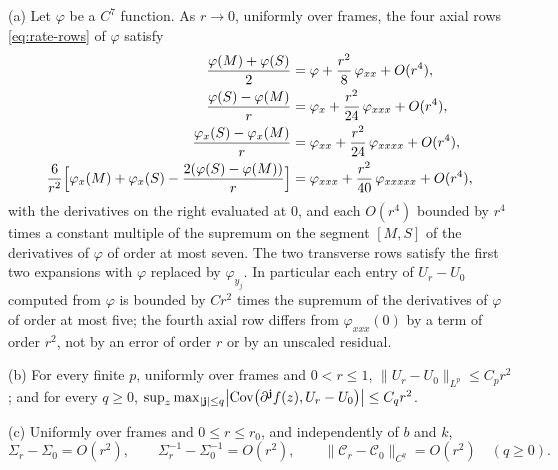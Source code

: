 \begin{lemma}\label{lem:rate-second}
\textup{(a)} Let $\varphi$ be a $C^7$ function. As $r\to0$, uniformly over frames, the four axial rows \eqref{eq:rate-rows} of $\varphi$ satisfy
\begin{equation}\label{eq:rate-rowexp}
\begin{aligned}
\frac{\varphi(M)+\varphi(S)}2&=\varphi+\frac{r^2}8\,\varphi_{xx}+O(r^4),\\
\frac{\varphi(S)-\varphi(M)}r&=\varphi_x+\frac{r^2}{24}\,\varphi_{xxx}+O(r^4),\\
\frac{\varphi_x(S)-\varphi_x(M)}r&=\varphi_{xx}+\frac{r^2}{24}\,\varphi_{xxxx}+O(r^4),\\
\frac6{r^2}\Bigl[\varphi_x(M)+\varphi_x(S)-\frac{2(\varphi(S)-\varphi(M))}r\Bigr]&=\varphi_{xxx}+\frac{r^2}{40}\,\varphi_{xxxxx}+O(r^4),
\end{aligned}
\end{equation}
with the derivatives on the right evaluated at $0$, and each $O(r^4)$ bounded by $r^4$ times a constant multiple of the supremum on the segment $[M,S]$ of the derivatives of $\varphi$ of order at most seven. The two transverse rows satisfy the first two expansions with $\varphi$ replaced by $\varphi_{y_j}$. In particular each entry of $U_r-U_0$ computed from $\varphi$ is bounded by $Cr^2$ times the supremum of the derivatives of $\varphi$ of order at most five; the fourth axial row differs from $\varphi_{xxx}(0)$ by a term of order $r^2$, not by an error of order $r$ or by an unscaled residual.

\textup{(b)} For every finite $p$, uniformly over frames and $0<r\le1$, $\|U_r-U_0\|_{L^p}\le C_pr^2$; and for every $q\ge0$, $\sup_z\max_{|\mathbf j|\le q}\bigl|\operatorname{Cov}\bigl(\partial^{\mathbf j}f(z),U_r-U_0\bigr)\bigr|\le C_qr^2$.

\textup{(c)} Uniformly over frames and $0\le r\le r_0$, and independently of $b$ and $k$,
\begin{equation}\label{eq:rate-R2}
\Sigma_r-\Sigma_0=O(r^2),\qquad \Sigma_r^{-1}-\Sigma_0^{-1}=O(r^2),\qquad \|\mathcal C_r-\mathcal C_0\|_{C^q}=O(r^2)\quad(q\ge0).
\end{equation}
\end{lemma}

